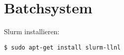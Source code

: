 \chapter{Batchsystem}
Slurm installieren:
\begin{lstlisting}[style=Bash]
$ sudo apt-get install slurm-llnl
\end{lstlisting}
